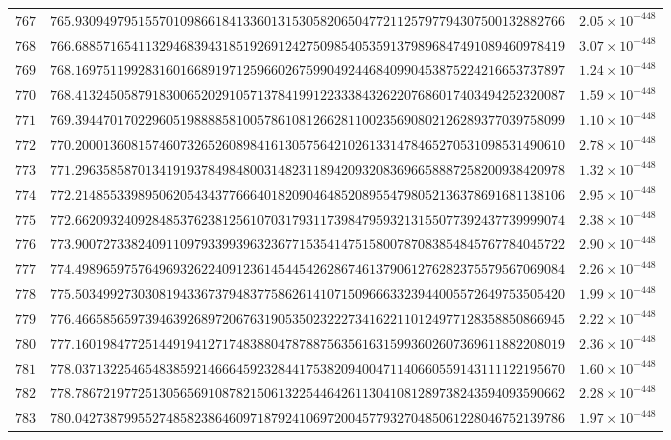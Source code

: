 \documentclass[12pt,reqno]{amsart}
\theoremstyle{remark}
\begin{document}
\begin{longtable}{clc}
$767$ & $765.9309497951557010986618413360131530582065047721125797794307500132882766$ & $2.05\times 10^{-448}$ \\
$768$ & $766.6885716541132946839431851926912427509854053591379896847491089460978419$ & $3.07\times 10^{-448}$ \\
$769$ & $768.1697511992831601668919712596602675990492446840990453875224216653737897$ & $1.24\times 10^{-448}$ \\
$770$ & $768.4132450587918300652029105713784199122333843262207686017403494252320087$ & $1.59\times 10^{-448}$ \\
$771$ & $769.3944701702296051988885810057861081266281100235690802126289377039758099$ & $1.10\times 10^{-448}$ \\
$772$ & $770.2000136081574607326526089841613057564210261331478465270531098531490610$ & $2.78\times 10^{-448}$ \\
$773$ & $771.2963585870134191937849848003148231189420932083696658887258200938420978$ & $1.32\times 10^{-448}$ \\
$774$ & $772.2148553398950620543437766640182090464852089554798052136378691681138106$ & $2.95\times 10^{-448}$ \\
$775$ & $772.6620932409284853762381256107031793117398479593213155077392437739999074$ & $2.38\times 10^{-448}$ \\
$776$ & $773.9007273382409110979339939632367715354147515800787083854845767784045722$ & $2.90\times 10^{-448}$ \\
$777$ & $774.4989659757649693262240912361454454262867461379061276282375579567069084$ & $2.26\times 10^{-448}$ \\
$778$ & $775.5034992730308194336737948377586261410715096663323944005572649753505420$ & $1.99\times 10^{-448}$ \\
$779$ & $776.4665856597394639268972067631905350232227341622110124977128358850866945$ & $2.22\times 10^{-448}$ \\
$780$ & $777.1601984772514491941271748388047878875635616315993602607369611882208019$ & $2.36\times 10^{-448}$ \\
$781$ & $778.0371322546548385921466645923284417538209400471140660559143111122195670$ & $1.60\times 10^{-448}$ \\
$782$ & $778.7867219772513056569108782150613225446426113041081289738243594093590662$ & $2.28\times 10^{-448}$ \\
$783$ & $780.0427387995527485823864609718792410697200457793270485061228046752139786$ & $1.97\times 10^{-448}$ \\

\end{longtable}
\end{document}
